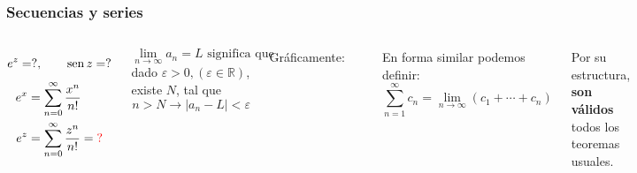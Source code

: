 \documentclass[9pt, aspectratio=169]{beamer}
\begin{document}
\begin{frame}[t]
    \frametitle{Secuencias y series}
 \begin{columns}[t]
     \[ e^z = ?, \qquad \operatorname{sen} z = ? \]
   \begin{align*} 
      e^x &= \sum_{n = 0}^{\infty} \frac{x^n}{n!}  \\
      e^z &= \sum_{n = 0}^{\infty} \frac{z^n}{n!} = \textcolor{red}{?} \\
  \end{align*}
  \begin{definition}
      \vspace{-0.5em}
      \[ \lim_{n \rightarrow \infty} a_n = L \text{ significa que} \]
      dado $\varepsilon > 0, (\varepsilon \in \mathbb{R})$, existe $N$, tal que \vspace{-0.5em}
      \[ n > N \rightarrow |a_n - L| < \varepsilon \]
    
  \end{definition}

    Gráficamente:
    \begin{center}
    \includegraphics[scale=0.35]{figs/fig-06.pdf}
    \end{center}
    En forma similar podemos definir:
    \[ \sum_{n = 1}^{\infty} c_n = \lim_{n \rightarrow \infty} (c_1 + \cdots + c_n) \]

        Por su estructura, \textbf{son válidos} todos los teoremas usuales.


\end{columns}
\end{frame}
\end{document}
